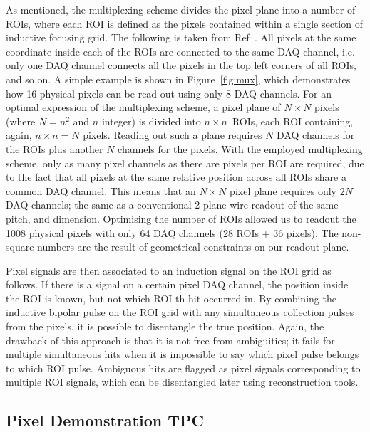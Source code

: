\documentclass[instruments,article,submit,moreauthors,pdftex]{Definitions/mdpi}
\begin{document}
As mentioned, the multiplexing scheme divides the pixel plane into a number of ROIs, where each ROI is defined as the pixels contained within a single section of inductive focusing grid. 
The following is taken from Ref~\cite{maplesyrup}.
All pixels at the same coordinate inside each of the ROIs are connected to the same DAQ channel, i.e. only one DAQ channel connects all the pixels in the top left corners of all ROIs, and so on.
A simple example is shown in Figure~\ref{fig:mux}, which demonstrates how 16 physical pixels can be read out using only 8 DAQ channels. 
For an optimal expression of the multiplexing scheme, a pixel plane of $N \times N$ pixels (where $N = n ^ 2$ and $n$ integer) is divided into $n \times n$~ROIs, each ROI containing, again, $n \times n = N$ pixels.
Reading out such a plane requires $N$ DAQ channels for the ROIs plus another $N$ channels for the pixels.
With the employed multiplexing scheme, only as many pixel channels as there are pixels per ROI are required, due to the fact that all pixels at the same relative position across all ROIs share a common DAQ channel.
This means that an $N \times N$ pixel plane requires only $2 N$ DAQ channels; the same as a conventional 2-plane wire readout of the same pitch, and dimension.
Optimising the number of ROIs allowed us to readout the 1008 physical pixels with only 64 DAQ channels (28 ROIs + 36 pixels).
The non-square numbers are the result of geometrical constraints on our readout plane.

Pixel signals are then associated to an induction signal on the ROI grid as follows. 
If there is a signal on a certain pixel DAQ channel, the position inside the ROI is known, but not which ROI th hit occurred in.
By combining the inductive bipolar pulse on the ROI grid with any simultaneous collection pulses from the pixels, it is possible to disentangle the true position.
Again, the drawback of this approach is that it is not free from ambiguities; it fails for multiple simultaneous hits when it is impossible to say which pixel pulse belongs to which ROI pulse.
Ambiguous hits are flagged as pixel signals corresponding to multiple ROI signals, which can be disentangled later using reconstruction tools. 

\subsection{Pixel Demonstration TPC} \label{sec:viper}
\end{document}
